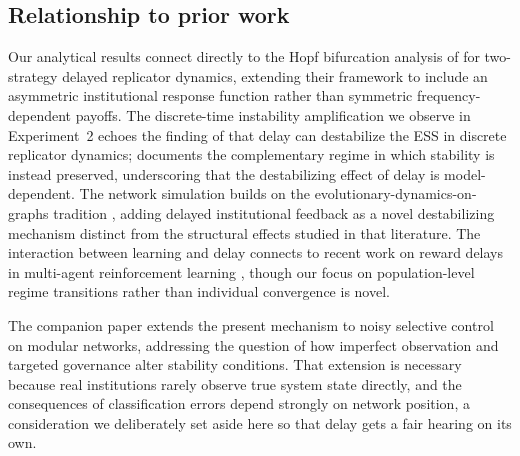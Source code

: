 \subsection{Relationship to prior work}

Our analytical results connect directly to the Hopf bifurcation analysis of \citet{wesson2016hopf} for two-strategy delayed replicator dynamics, extending their framework to include an asymmetric institutional response function rather than symmetric frequency-dependent payoffs. The discrete-time instability amplification we observe in Experiment~2 echoes the finding of \citet{alboszta2004stability} that delay can destabilize the ESS in discrete replicator dynamics; \citet{iijima2012delayed} documents the complementary regime in which stability is instead preserved, underscoring that the destabilizing effect of delay is model-dependent. The network simulation builds on the evolutionary-dynamics-on-graphs tradition \citep{lieberman2005evolutionary, ohtsuki2006simple, szabo2007evolutionary}, adding delayed institutional feedback as a novel destabilizing mechanism distinct from the structural effects studied in that literature. The interaction between learning and delay connects to recent work on reward delays in multi-agent reinforcement learning \citep{zhang2023marl}, though our focus on population-level regime transitions rather than individual convergence is novel.

The companion paper extends the present mechanism to noisy selective control on modular networks, addressing the question of how imperfect observation and targeted governance alter stability conditions. That extension is necessary because real institutions rarely observe true system state directly, and the consequences of classification errors depend strongly on network position, a consideration we deliberately set aside here so that delay gets a fair hearing on its own.
